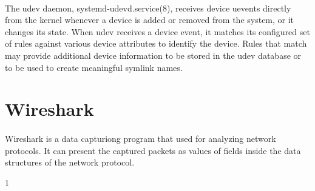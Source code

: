 \documentclass[mscthesis]{usiinfthesis}
\begin{document}
\paragraph{}
The udev daemon, systemd-udevd.service(8), receives device uevents directly from the kernel whenever a device is added or removed from the system, or it changes its state. When udev receives a device event, it matches its configured set of rules against various device attributes to identify the device. Rules that match may provide additional device information to be stored in the udev database or to be used to create meaningful symlink names.

\section{Wireshark}\label{sec:Wireshark}
\paragraph{}
Wireshark is a data capturiong program that used for analyzing network protocols. It can present the captured packets as values of fields inside the data structures of the network protocol.

%
%



1
\end{document}
